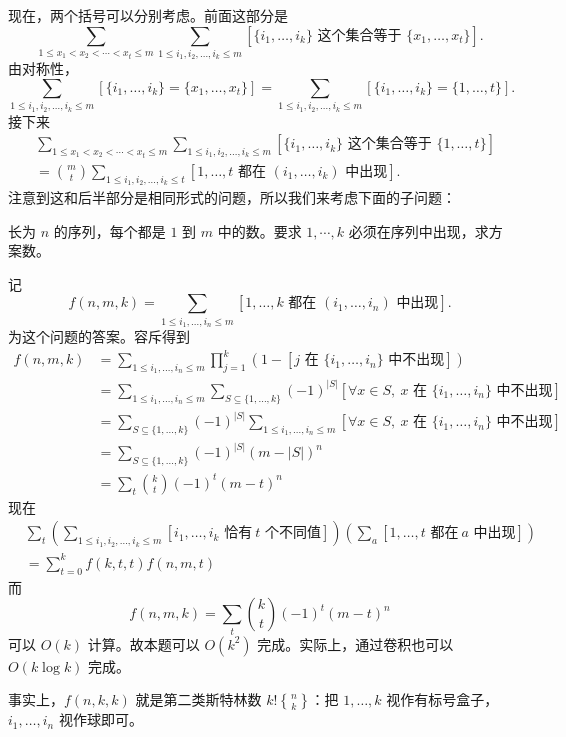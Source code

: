     现在，两个括号可以分别考虑。前面这部分是
    $$
    \sum_{1\le x_1<x_2<\cdots<x_t\le m}\sum_{1\le i_1,i_2,\ldots,i_k\le m}[\{i_1,\ldots,i_k\}\text{ 这个集合等于 }\{x_1,\ldots,x_t\}].
    $$
    由对称性，
    $$
    \sum_{1\le i_1,i_2,\ldots,i_k\le m}[\{i_1,\ldots,i_k\}=\{x_1,\ldots,x_t\}]=\sum_{1\le i_1,i_2,\ldots,i_k\le m}[\{i_1,\ldots,i_k\}=\{1,\ldots,t\}].
    $$
    接下来
    $$
    \begin{aligned}
    &\sum_{1\le x_1<x_2<\cdots<x_t\le m}\sum_{1\le i_1,i_2,\ldots,i_k\le m}[\{i_1,\ldots,i_k\}\text{ 这个集合等于 }\{1,\ldots,t\}]\\
    &=\binom{m}{t}\sum_{1\le i_1,i_2,\ldots,i_k\le t}[1,\ldots,t\text{ 都在 }(i_1,\ldots,i_k)\text{ 中出现}].
    \end{aligned}
    $$
    注意到这和后半部分是相同形式的问题，所以我们来考虑下面的子问题：
    \begin{example}
        长为 $n$ 的序列，每个都是 $1$ 到 $m$ 中的数。要求 $1,\cdots,k$ 必须在序列中出现，求方案数。
    \end{example}
    记 
    $$
    f(n,m,k)=\sum_{1\le i_1,\ldots,i_n\le m}[1,\ldots,k\text{ 都在 }(i_1,\ldots,i_n)\text{ 中出现}].
    $$
    为这个问题的答案。容斥得到
    $$
    \begin{aligned}
    f(n,m,k)&=\sum_{1\le i_1,\ldots,i_n\le m}\prod_{j=1}^k(1-[j\text{ 在 }\{i_1,\ldots,i_n\}\text{ 中不出现}])\\
    &=\sum_{1\le i_1,\ldots,i_n\le m}\sum_{S\subseteq \{1,\ldots,k\}}(-1)^{|S|}[\forall x\in S,\ x\text{ 在 }\{i_1,\ldots,i_n\}\text{ 中不出现}]\\
    &=\sum_{S\subseteq \{1,\ldots,k\}}(-1)^{|S|}\sum_{1\le i_1,\ldots,i_n\le m}[\forall x\in S,\ x\text{ 在 }\{i_1,\ldots,i_n\}\text{ 中不出现}]\\
    &=\sum_{S\subseteq \{1,\ldots,k\}}(-1)^{|S|}(m-|S|)^n\\
    &=\sum_t\binom{k}{t}(-1)^{t}(m-t)^n
    \end{aligned}
    $$
    现在
    $$
    \begin{aligned}
        &\sum_t\left(\sum_{1\le i_1,i_2,\ldots,i_k\le m}[i_1,\ldots,i_k\text{ 恰有}\ t\text{ 个不同值}]\right)\left(\sum_a[1,\ldots,t\text{ 都在}\ a\text{ 中出现}]\right)\\
        &=\sum_{t=0}^k f(k,t,t)f(n,m,t)
    \end{aligned}
    $$
    而
    $$
    f(n,m,k)=\sum_t\binom{k}{t}(-1)^t(m-t)^n
    $$
    可以 $O(k)$ 计算。故本题可以 $O(k^2)$ 完成。实际上，通过卷积也可以 $O(k\log k)$ 完成。    
    \begin{remark}
        事实上，$f(n,k,k)$ 就是第二类斯特林数 $k! {n \brace k}$：把 $1,\ldots,k$ 视作有标号盒子，$i_1,\ldots,i_n$ 视作球即可。
    \end{remark}

